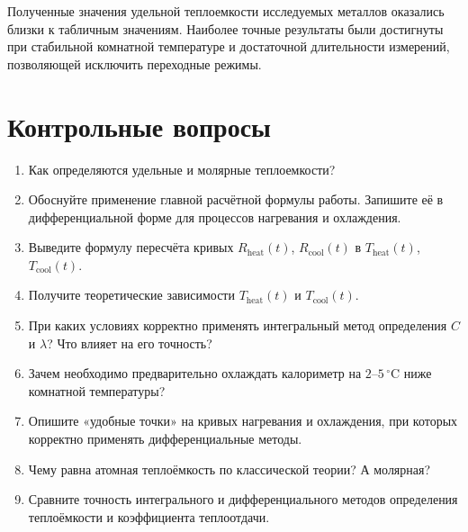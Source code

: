 \documentclass[a4paper,12pt]{article} %
\begin{document}
Полученные значения удельной теплоемкости исследуемых металлов оказались близки к табличным значениям. Наиболее точные результаты были достигнуты при стабильной комнатной температуре и достаточной длительности измерений, позволяющей исключить переходные режимы.

\vspace{1cm}

\section*{Контрольные вопросы}
\begin{enumerate}
    \item Как определяются удельные и молярные теплоемкости?
    \item Обоснуйте применение главной расчётной формулы работы. Запишите её в дифференциальной форме для процессов нагревания и охлаждения.
    \item Выведите формулу пересчёта кривых $R_{\text{heat}}(t)$, $R_{\text{cool}}(t)$ в $T_{\text{heat}}(t)$, $T_{\text{cool}}(t)$.
    \item Получите теоретические зависимости $T_{\text{heat}}(t)$ и $T_{\text{cool}}(t)$.
    \item При каких условиях корректно применять интегральный метод определения $C$ и $\lambda$? Что влияет на его точность?
    \item Зачем необходимо предварительно охлаждать калориметр на $2\text{–}5\,^\circ\text{C}$ ниже комнатной температуры?
    \item Опишите «удобные точки» на кривых нагревания и охлаждения, при которых корректно применять дифференциальные методы.
    \item Чему равна атомная теплоёмкость по классической теории? А молярная?
    \item Сравните точность интегрального и дифференциального методов определения теплоёмкости и коэффициента теплоотдачи.
\end{enumerate}
\end{document}
